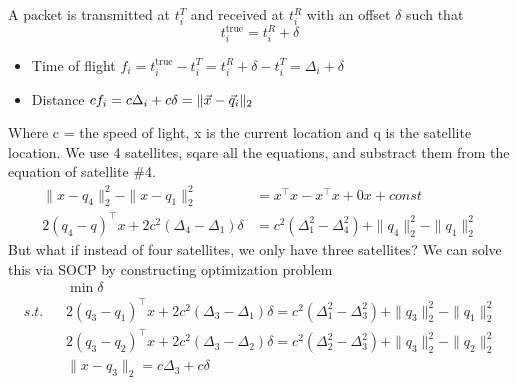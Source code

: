 \begin{example}
	A packet is transmitted at $t_i^T$ and received at $t_i^R$ with an offset $\delta$ such that
	\[
t_i^{\text{true}} = t_i^R+\delta
	\]
	\begin{itemize}
		\item Time of flight $f_i = t_i^{\text{true}} - t_i^T = t_i^R+\delta- t_i^T = \Delta_i+\delta$
		\item Distance $cf_i = c \Delta_i+c \delta = \|\vec{x}-\vec{q}_i\|_2$
	\end{itemize}
	Where c = the speed of light, x is the current location and q is the satellite location. We use 4 satellites, sqare all the equations, and substract them from the equation of satellite \#4.
	\begin{align*}
		\|x-q_4\|_2^2 - \|x-q_1\|_2^2&=x^\top x-x^\top x+0x+const\\
		2(q_4-q)^\top x+2c^2(\Delta_4- \Delta_1)\delta &= c^2(\Delta_1^2- \Delta_4^2)+\|q_4\|_2^2-\|q_1\|_2^2
	\end{align*}
	But what if instead of four satellites, we only have three satellites? We can solve this via SOCP by constructing optimization problem
	\begin{align*}
	&\min \delta\\
	s.t.\;\;\;&2(q_3-q_1)^\top x+2c^2(\Delta_3- \Delta_1)\delta = c^2(\Delta_1^2- \Delta_3^2)+\|q_3\|_2^2-\|q_1\|_2^2\\
	&2(q_3-q_2)^\top x+2c^2(\Delta_3- \Delta_2)\delta = c^2(\Delta_2^2- \Delta_3^2)+\|q_3\|_2^2-\|q_2\|_2^2\\
	&\|x-q_3\|_2=c \Delta_3+c \delta
	\end{align*}
\end{example}

